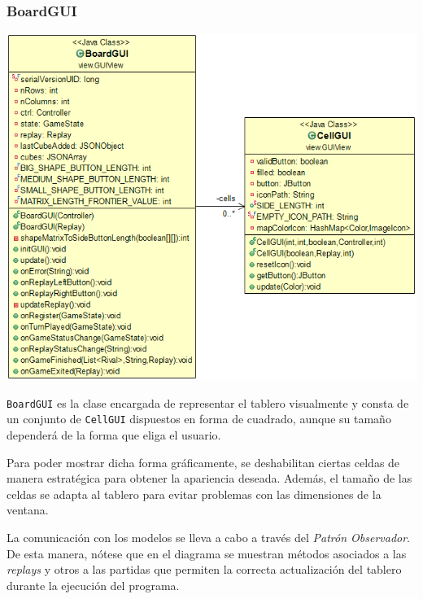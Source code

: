 \documentclass[../DocumentoOficial.tex]{subfiles}
\begin{document}
\subsubsection{BoardGUI}
\begin{center}
\includegraphics[scale=0.55]{boardgui-cellgui.png}
\end{center}

\texttt{BoardGUI} es la clase encargada de representar el tablero visualmente y consta de un conjunto de \texttt{CellGUI} dispuestos en forma de cuadrado, aunque su tamaño dependerá de la forma que eliga el usuario.

Para poder mostrar dicha forma gráficamente, se deshabilitan ciertas celdas de manera estratégica para obtener la apariencia deseada. Además, el tamaño de las celdas se adapta al tablero para evitar problemas con las dimensiones de la ventana.

La comunicación con los modelos se lleva a cabo a través del \textit{Patrón Observador}. De esta manera, nótese que en el diagrama se muestran métodos asociados a las \textit{replays} y otros a las partidas que permiten la correcta actualización del tablero durante la ejecución del programa.
\end{document}
